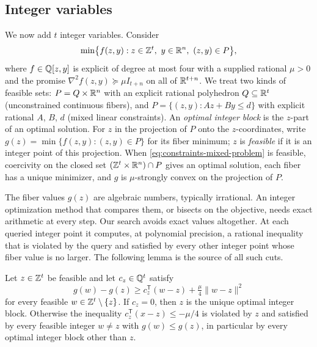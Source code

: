 \subsection{Integer variables}
\label{sec:constraints-integer}

We now add $t$ integer variables. Consider
\begin{equation}\label{eq:constraints-mixed-problem}
 \min\bigl\{f(z,y):z\in\mathbb Z^t,\ y\in\mathbb R^n,\ (z,y)\in P\bigr\},
\end{equation}
where $f\in\mathbb Q[z,y]$ is explicit of degree at most four with a supplied
rational $\mu>0$ and the promise $\nabla^2f(z,y)\succeq\mu I_{t+n}$ on all of
$\mathbb R^{t+n}$. We treat two kinds of feasible sets: $P=Q\times\mathbb R^n$ with an
explicit rational polyhedron $Q\subseteq\mathbb R^t$ (unconstrained continuous
fibers), and $P=\{(z,y):Az+By\le d\}$ with explicit rational $A$, $B$, $d$
(mixed linear constraints). An \emph{optimal integer block} is the $z$-part of
an optimal solution. For $z$ in the projection of $P$ onto the $z$-coordinates,
write $g(z)=\min\{f(z,y):(z,y)\in P\}$ for its fiber minimum; $z$ is
\emph{feasible} if it is an integer point of this projection. When
\eqref{eq:constraints-mixed-problem} is feasible, coercivity on the closed set
$(\mathbb Z^t\times\mathbb R^n)\cap P$ gives an optimal solution, each fiber has a unique
minimizer, and $g$ is $\mu$-strongly convex on the projection of $P$.

The fiber values $g(z)$ are algebraic numbers, typically irrational. An
integer optimization method that compares them, or bisects on the objective,
needs exact arithmetic at every step. Our search avoids exact values
altogether. At each queried integer point it computes, at polynomial
precision, a rational inequality that is violated by the query and satisfied
by every other integer point whose fiber value is no larger. The following
lemma is the source of all such cuts.

\begin{lemma}
\label{lem:constraints-integer-cut}
Let $z\in\mathbb Z^t$ be feasible and let $c_z\in\mathbb Q^t$ satisfy
\begin{equation}\label{eq:constraints-integer-cut}
 g(w)-g(z)\ge c_z^{\mathsf T}(w-z)+\tfrac\mu4\|w-z\|^2
\end{equation}
for every feasible $w\in\mathbb Z^t\setminus\{z\}$. If $c_z=0$, then $z$ is the
unique optimal integer block. Otherwise the inequality
$c_z^{\mathsf T}(x-z)\le-\mu/4$ is violated by $z$ and satisfied by every
feasible integer $w\ne z$ with $g(w)\le g(z)$, in particular by every optimal
integer block other than $z$.
\end{lemma}

